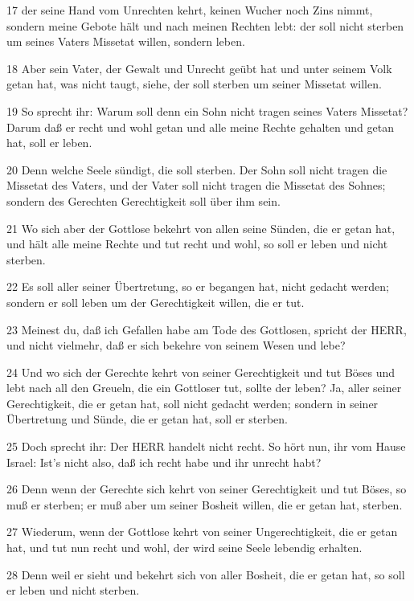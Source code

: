 \par 17 der seine Hand vom Unrechten kehrt, keinen Wucher noch Zins nimmt, sondern meine Gebote hält und nach meinen Rechten lebt: der soll nicht sterben um seines Vaters Missetat willen, sondern leben.
\par 18 Aber sein Vater, der Gewalt und Unrecht geübt hat und unter seinem Volk getan hat, was nicht taugt, siehe, der soll sterben um seiner Missetat willen.
\par 19 So sprecht ihr: Warum soll denn ein Sohn nicht tragen seines Vaters Missetat? Darum daß er recht und wohl getan und alle meine Rechte gehalten und getan hat, soll er leben.
\par 20 Denn welche Seele sündigt, die soll sterben. Der Sohn soll nicht tragen die Missetat des Vaters, und der Vater soll nicht tragen die Missetat des Sohnes; sondern des Gerechten Gerechtigkeit soll über ihm sein.
\par 21 Wo sich aber der Gottlose bekehrt von allen seine Sünden, die er getan hat, und hält alle meine Rechte und tut recht und wohl, so soll er leben und nicht sterben.
\par 22 Es soll aller seiner Übertretung, so er begangen hat, nicht gedacht werden; sondern er soll leben um der Gerechtigkeit willen, die er tut.
\par 23 Meinest du, daß ich Gefallen habe am Tode des Gottlosen, spricht der HERR, und nicht vielmehr, daß er sich bekehre von seinem Wesen und lebe?
\par 24 Und wo sich der Gerechte kehrt von seiner Gerechtigkeit und tut Böses und lebt nach all den Greueln, die ein Gottloser tut, sollte der leben? Ja, aller seiner Gerechtigkeit, die er getan hat, soll nicht gedacht werden; sondern in seiner Übertretung und Sünde, die er getan hat, soll er sterben.
\par 25 Doch sprecht ihr: Der HERR handelt nicht recht. So hört nun, ihr vom Hause Israel: Ist's nicht also, daß ich recht habe und ihr unrecht habt?
\par 26 Denn wenn der Gerechte sich kehrt von seiner Gerechtigkeit und tut Böses, so muß er sterben; er muß aber um seiner Bosheit willen, die er getan hat, sterben.
\par 27 Wiederum, wenn der Gottlose kehrt von seiner Ungerechtigkeit, die er getan hat, und tut nun recht und wohl, der wird seine Seele lebendig erhalten.
\par 28 Denn weil er sieht und bekehrt sich von aller Bosheit, die er getan hat, so soll er leben und nicht sterben.
